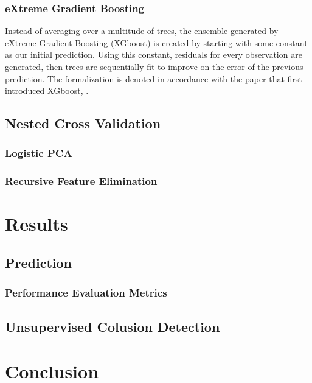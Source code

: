 \documentclass[a4paper,12pt, headsepline]{scrartcl}
\numberwithin{equation}{section}
\begin{document}
\subsubsection{eXtreme Gradient Boosting}\label{subsubsec:xgb}
Instead of averaging over a multitude of trees, the ensemble generated by eXtreme Gradient Boosting (XGboost) is created by starting with some constant as our initial prediction. Using this constant, residuals for every observation are generated, then trees are sequentially fit to improve on the error of the previous prediction. The formalization is denoted in accordance with the paper that first introduced XGboost, \citet{chen2016}.\\



\subsection{Nested Cross Validation}\label{subsec:nest}
\subsubsection{Logistic PCA}\label{subsubsec:logp}
\subsubsection{Recursive Feature Elimination}\label{subsubsec:rfe}
\section{Results}\label{sec:res}
\subsection{Prediction}\label{subsec:pred}
\subsubsection{Performance Evaluation Metrics}\label{subsubsec:per}
\subsection{Unsupervised Colusion Detection}\label{subsec:col}
\section{Conclusion}\label{sec:con}
 
\newpage
\printbibliography
\end{document}
